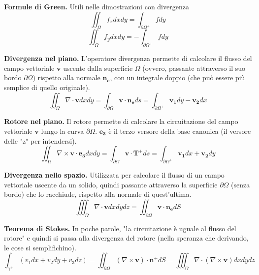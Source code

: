 \documentclass[a4paper,portrait,12pt]{article}
\theoremstyle{definition}
\begin{document}
\textbf{Formule di Green.} Utili nelle dimostrazioni con divergenza 
\begin{equation}
\iint_{\Omega}f_xdxdy = \int_{\partial \Omega^+} fdy
\end{equation}
\begin{equation}
\iint_{\Omega}f_ydxdy = -\int_{\partial \Omega^+} fdy  
\end{equation}

\textbf{Divergenza nel piano.} L'operatore divergenza permette di calcolare il flusso del campo vettoriale 
$\mathbf{v}$ uscente dalla superficie $\Omega$ (ovvero, passante attraverso il suo bordo $\partial \Omega$) 
rispetto alla normale $\mathbf{n_e}$, con un integrale doppio (che può essere più semplice di quello 
originale).
\begin{equation}
\iint_{\Omega}\nabla \cdot \mathbf{v}dxdy = \int_{\partial \Omega}\mathbf{v} \cdot \mathbf{n_e}ds = 
\int_{\partial \Omega^+}\mathbf{v_1}dy - \mathbf{v_2}dx
\end{equation}

\textbf{Rotore nel piano.} Il rotore permette di calcolare la circuitazione del campo vettoriale $\mathbf{v}$ 
lungo la curva $\partial \Omega$. $\mathbf{e_3}$ è il terzo versore della base canonica (il versore delle 
"z" per intendersi).
\begin{equation}
\iint_{\Omega}\nabla \times \mathbf{v} \cdot \mathbf{e_3}dxdy = 
\int_{\partial \Omega}\mathbf{v}\cdot\mathbf{T^+}ds = \int_{\partial \Omega^+}\mathbf{v_1}dx + \mathbf{v_2}dy
\end{equation}

\textbf{Divergenza nello spazio.} Utilizzata per calcolare il flusso di un campo vettoriale uscente da un 
solido, quindi passante attraverso la superficie $\partial \Omega$ (senza bordo) che lo racchiude, rispetto 
alla normale di quest'ultima.
\begin{equation}
\iiint_{\Omega}\nabla\cdot\mathbf{v}dx dy dz = \iint_{\partial \Omega}\mathbf{v}\cdot\mathbf{n_e}dS
\end{equation}

\textbf{Teorema di Stokes.} In poche parole, "la circuitazione è uguale al flusso del rotore" e quindi si 
passa alla divergenza del rotore (nella speranza che derivando, le cose si semplifichino).
\begin{equation} 
\int_{\gamma^+}(v_1dx + v_2dy + v_3dz) = \iint_{\partial \Omega}(\nabla\times\mathbf{v})\cdot\mathbf{n^+}dS = 
\iiint_{\Omega}\nabla\cdot(\nabla\times\mathbf{v})dxdydz
\end{equation}
\end{document}
